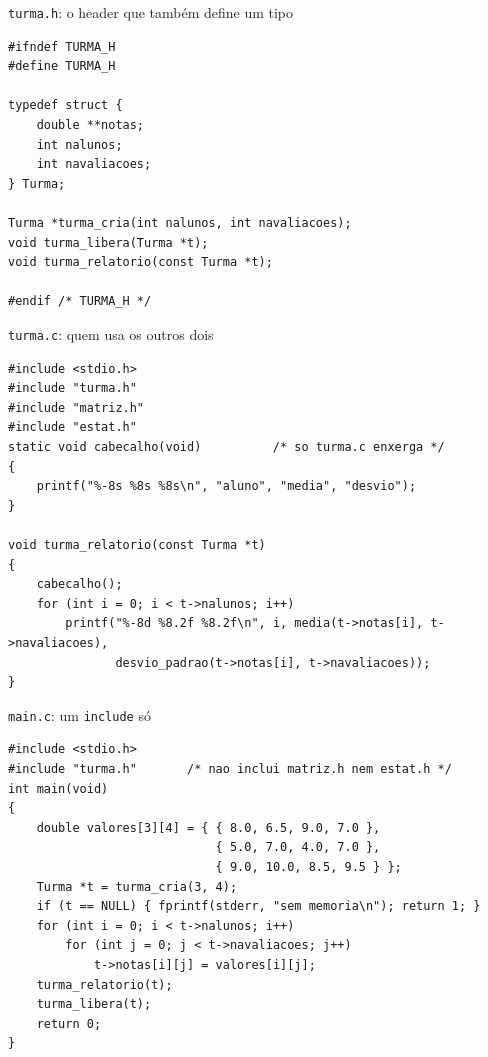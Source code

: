 \documentclass[aspectratio=169]{beamer}
\begin{document}
\begin{frame}[fragile]{\texttt{turma.h}: o header que também define um tipo}
\begin{lstlisting}[basicstyle=\ttfamily\scriptsize]
#ifndef TURMA_H
#define TURMA_H

typedef struct {
    double **notas;
    int nalunos;
    int navaliacoes;
} Turma;

Turma *turma_cria(int nalunos, int navaliacoes);
void turma_libera(Turma *t);
void turma_relatorio(const Turma *t);

#endif /* TURMA_H */
\end{lstlisting}
\end{frame}

\begin{frame}[fragile]{\texttt{turma.c}: quem usa os outros dois}
\begin{lstlisting}[basicstyle=\ttfamily\scriptsize]
#include <stdio.h>
#include "turma.h"
#include "matriz.h"
#include "estat.h"
static void cabecalho(void)          /* so turma.c enxerga */
{
    printf("%-8s %8s %8s\n", "aluno", "media", "desvio");
}

void turma_relatorio(const Turma *t)
{
    cabecalho();
    for (int i = 0; i < t->nalunos; i++)
        printf("%-8d %8.2f %8.2f\n", i, media(t->notas[i], t->navaliacoes),
               desvio_padrao(t->notas[i], t->navaliacoes));
}
\end{lstlisting}
\end{frame}

\begin{frame}[fragile]{\texttt{main.c}: um \texttt{include} só}
\begin{lstlisting}[basicstyle=\ttfamily\scriptsize]
#include <stdio.h>
#include "turma.h"       /* nao inclui matriz.h nem estat.h */
int main(void)
{
    double valores[3][4] = { { 8.0, 6.5, 9.0, 7.0 },
                             { 5.0, 7.0, 4.0, 7.0 },
                             { 9.0, 10.0, 8.5, 9.5 } };
    Turma *t = turma_cria(3, 4);
    if (t == NULL) { fprintf(stderr, "sem memoria\n"); return 1; }
    for (int i = 0; i < t->nalunos; i++)
        for (int j = 0; j < t->navaliacoes; j++)
            t->notas[i][j] = valores[i][j];
    turma_relatorio(t);
    turma_libera(t);
    return 0;
}
\end{lstlisting}
\end{frame}
\end{document}
